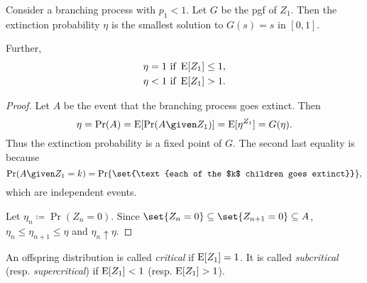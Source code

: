 \begin{theorem*}
    Consider a branching process with $p_1 < 1$.
    Let $G$ be the pgf of $Z_1$.
    Then the extinction probability $\eta$ is the smallest solution to
    $G(s) = s$ in $[0, 1]$.

    Further, \begin{align*}
        \eta &= 1 \text{ if } \operatorname{\mathrm{E}}[Z_1] \leq 1, \\
        \eta &< 1 \text{ if } \operatorname{\mathrm{E}}[Z_1] > 1.
    \end{align*}
\end{theorem*}
\begin{proof}
    Let $A$ be the event that the branching process goes extinct.
    Then \[
        \eta = \Pr(A) = \E[\Pr(A \given Z_1)] = \E[\eta^{Z_1}] = G(\eta).
    \] Thus the extinction probability is a fixed point of $G$.
    The second last equality is because \[
        \Pr(A \given Z_1 = k) =
            \Pr\set{\text{each of the $k$ children goes extinct}},
    \] which are independent events.

    Let $\eta_n \coloneq \Pr(Z_n = 0)$.
    Since $\set{Z_n = 0} \subseteq \set{Z_{n+1} = 0} \subseteq A$,
    $\eta_n \le \eta_{n+1} \le \eta$
    and $\eta_n \uparrow \eta$.
\end{proof}

\begin{definition}[Criticality] \label{def:criticality}
    An offspring distribution is called \emph{critical} if $\operatorname{\mathrm{E}}[Z_1] = 1$.
    It is called \emph{subcritical} (resp. \emph{supercritical}) if
    $\operatorname{\mathrm{E}}[Z_1] < 1$ (resp. $\operatorname{\mathrm{E}}[Z_1] > 1$).
\end{definition}
